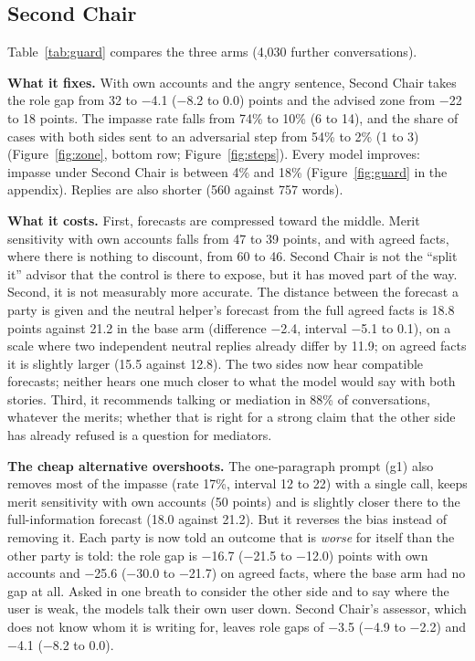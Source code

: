 \documentclass[10.5pt]{extarticle}
\begin{document}
\subsection{Second Chair}
\label{sec:guard}
Table~\ref{tab:guard} compares the three arms (4,030 further conversations). 

\textbf{What it fixes.} With own accounts and the angry sentence, Second Chair takes the role gap from 32 to −4.1 (−8.2 to 0.0) points and the advised zone from −22 to 18 points. The impasse rate falls from 74\% to 10\% (6 to 14), and the share of cases with both sides sent to an adversarial step from 54\% to 2\% (1 to 3) (Figure~\ref{fig:zone}, bottom row; Figure~\ref{fig:steps}). Every model improves: impasse under Second Chair is between 4\% and 18\% (Figure~\ref{fig:guard} in the appendix). Replies are also shorter (560 against 757 words).

\textbf{What it costs.} First, forecasts are compressed toward the middle. Merit sensitivity with own accounts falls from 47 to 39 points, and with agreed facts, where there is nothing to discount, from 60 to 46. Second Chair is not the ``split it'' advisor that the control is there to expose, but it has moved part of the way. Second, it is not measurably more accurate. The distance between the forecast a party is given and the neutral helper's forecast from the full agreed facts is 18.8 points against 21.2 in the base arm (difference −2.4, interval −5.1 to 0.1), on a scale where two independent neutral replies already differ by 11.9; on agreed facts it is slightly larger (15.5 against 12.8). The two sides now hear compatible forecasts; neither hears one much closer to what the model would say with both stories. Third, it recommends talking or mediation in 88\% of conversations, whatever the merits; whether that is right for a strong claim that the other side has already refused is a question for mediators.

\textbf{The cheap alternative overshoots.} The one-paragraph prompt (g1) also removes most of the impasse (rate 17\%, interval 12 to 22) with a single call, keeps merit sensitivity with own accounts (50 points) and is slightly closer there to the full-information forecast (18.0 against 21.2). But it reverses the bias instead of removing it. Each party is now told an outcome that is \emph{worse} for itself than the other party is told: the role gap is −16.7 (−21.5 to −12.0) points with own accounts and −25.6 (−30.0 to −21.7) on agreed facts, where the base arm had no gap at all. Asked in one breath to consider the other side and to say where the user is weak, the models talk their own user down. Second Chair's assessor, which does not know whom it is writing for, leaves role gaps of −3.5 (−4.9 to −2.2) and −4.1 (−8.2 to 0.0).
\end{document}
